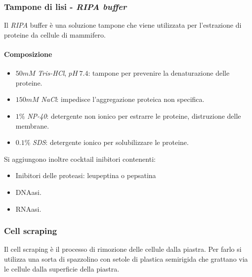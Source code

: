 		\subsubsection{Tampone di lisi - \emph{RIPA buffer}}
		Il \emph{RIPA} buffer \`e una soluzione tampone che viene utilizzata per l'estrazione di proteine da cellule di mammifero.
			
			\paragraph{Composizione}
		\begin{multicols}{2}
			\begin{itemize}
				\item $50mM$ \emph{Tris-HCl}, $pH\ 7.4$: tampone per prevenire la denaturazione delle proteine.
				\item $150mM$ \emph{NaCl}: impedisce l'aggregazione proteica non specifica.
				\item $1\%$ \emph{NP-40}: detergente non ionico per estrarre le proteine, distruzione delle membrane.
				\item $0.1\%$ \emph{SDS}: detergente ionico per solubilizzare le proteine.
			\end{itemize}
		\end{multicols}
			Si aggiungono inoltre cocktail inibitori contenenti:
		\begin{multicols}{2}
			\begin{itemize}
				\item Inibitori delle proteasi: leupeptina o pepsatina
				\item DNAasi.
				\item RNAasi.
			\end{itemize}
		\end{multicols}

		\subsubsection{Cell scraping}
		Il cell scraping \`e il processo di rimozione delle cellule dalla piastra.
		Per farlo si utilizza una sorta di spazzolino con setole di plastica semirigida che grattano via le cellule dalla superficie della piastra. 

